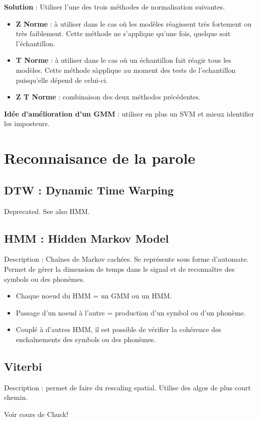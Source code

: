 \documentclass[a4paper, 12pt, leqno]{article}
\begin{document}
\textbf{Solution} : Utiliser l'une des trois méthodes de normalisation suivantes.
\begin{itemize}
  \item \textbf{Z Norme} : à utiliser dans le cas où les modèles
  réagissent très fortement ou très faiblement. Cette méthode ne
  s'applique qu'une fois, quelque soit l'échantillon.
  \item \textbf{T Norme} : à utiliser dans le cas où un échantillon fait
  réagir tous les modèles. Cette méthode sàpplique au moment des tests
  de l'echantillon puisqu'elle dépend de celui-ci.
  \item \textbf{Z T Norme} : combinaison des deux méthodes précédentes.
\end{itemize}

\textbf{Idée d'amélioration d'un GMM} : utiliser en plus un SVM et mieux
  identifier les imposteurs.


\section{Reconnaisance de la parole}
\subsection{DTW : Dynamic Time Warping}

Deprecated.
See also HMM.

\subsection{HMM : Hidden Markov Model}

Description : Chaînes de Markov cachées. Se représente sous forme
d'automate. Permet de gérer la dimension de temps dans le signal et de
reconnaître des symbols ou des phonèmes.

\begin{itemize}
  \item Chaque noeud du HMM = un GMM ou un HMM.
  \item Passage d'un noeud à l'autre = production d'un symbol ou d'un
  phonème.
  \item Couplé à d'autres HMM, il est possible de vérifier la cohérence
  des enchaînements des symbols ou des phonèmes.
\end{itemize}

\subsection{Viterbi}

Description : permet de faire du rescaling spatial. Utilise des algos de plus
court chemin.

Voir cours de Chuck!
\end{document}
